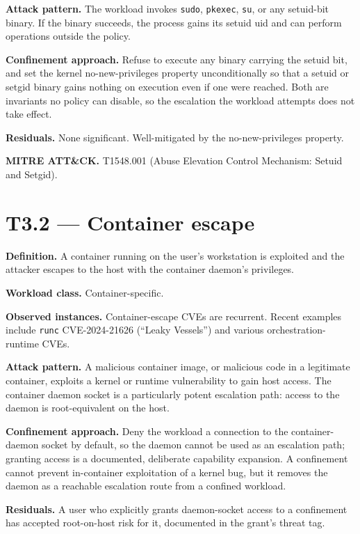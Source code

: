 \textbf{Attack pattern.} The workload invokes \texttt{sudo},
\texttt{pkexec}, \texttt{su}, or any setuid-bit binary. If the binary
succeeds, the process gains its setuid uid and can perform operations
outside the policy.

\textbf{Confinement approach.} Refuse to execute any binary carrying the
setuid bit, and set the kernel no-new-privileges property
unconditionally so that a setuid or setgid binary gains nothing on
execution even if one were reached. Both are invariants no policy can
disable, so the escalation the workload attempts does not take effect.

\textbf{Residuals.} None significant. Well-mitigated by the
no-new-privileges property.

\textbf{MITRE ATT\&CK.} T1548.001 (Abuse Elevation Control Mechanism:
Setuid and Setgid).

\hypertarget{t3.2-container-escape}{%
\section{T3.2 --- Container escape}\label{t3.2-container-escape}}

\textbf{Definition.} A container running on the user's workstation is
exploited and the attacker escapes to the host with the container
daemon's privileges.

\textbf{Workload class.} Container-specific.

\textbf{Observed instances.} Container-escape CVEs are recurrent. Recent
examples include \texttt{runc} CVE-2024-21626 (``Leaky Vessels'') and
various orchestration-runtime CVEs.

\textbf{Attack pattern.} A malicious container image, or malicious code
in a legitimate container, exploits a kernel or runtime vulnerability to
gain host access. The container daemon socket is a particularly potent
escalation path: access to the daemon is root-equivalent on the host.

\textbf{Confinement approach.} Deny the workload a connection to the
container-daemon socket by default, so the daemon cannot be used as an
escalation path; granting access is a documented, deliberate capability
expansion. A confinement cannot prevent in-container exploitation of a
kernel bug, but it removes the daemon as a reachable escalation route
from a confined workload.

\textbf{Residuals.} A user who explicitly grants daemon-socket access to
a confinement has accepted root-on-host risk for it, documented in the
grant's threat tag.

